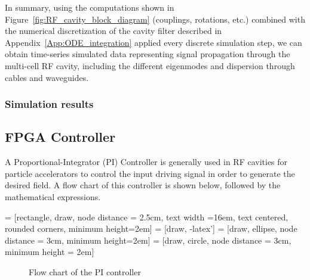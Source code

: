 \documentclass[a4paper,12pt]{article}
\begin{document}
In summary, using the computations shown in Figure~\ref{fig:RF_cavity_block_diagram} (couplings, rotations, etc.) combined with the numerical discretization of the cavity filter described in Appendix~\ref{App:ODE_integration} applied every discrete simulation step, we can obtain time-series simulated data representing signal propagation through the multi-cell RF cavity, including the different eigenmodes and dispersion through cables and waveguides.

\subsubsection{Simulation results}


\subsection{FPGA Controller}

A Proportional-Integrator (PI) Controller is generally used in RF cavities for particle accelerators to control the input driving signal in order to generate the desired field. A flow chart of this controller is shown below, followed by the mathematical expressions. 

 = [rectangle, draw, node distance = 2.5cm, text width =16em, text centered, rounded corners, minimum height=2em]
 = [draw, -latex']
 = [draw, ellipse,  node distance = 3cm, minimum height=2em]
 = [draw, circle, node distance = 3cm, minimum height = 2em]

\begin{figure}[H]
\centering

\caption{Flow chart of the PI controller}
\end{figure}
\end{document}
